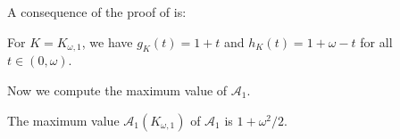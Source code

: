 A consequence of the proof of  is:

\begin{corollary}

For \(K = K_{\omega, 1}\), we have \(g_K(t) = 1 + t\) and \(h_K(t) = 1 + \omega - t\) for all \(t \in (0, \omega)\).

\label{cor:maximum-presofa-a1-arm-length}
\end{corollary}

Now we compute the maximum value of \(\mathcal{A}_1\).

\begin{theorem}

The maximum value \(\mathcal{A}_1(K_{\omega, 1})\) of \(\mathcal{A}_1\) is \(1 + \omega^2/2\).

\label{thm:maximum-presofa-a1-area}
\end{theorem}

